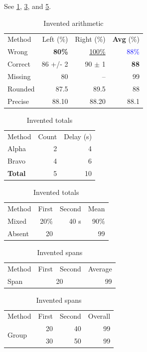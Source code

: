 See \ref{tab:averages}, \ref{tab:totals}, and \ref{tab:spans}.
\begin{table}\caption{Invented arithmetic}\label{tab:averages}
\begin{tabular}{lrrr}
\toprule
Method & Left (\%) & Right (\%) & \textbf{Avg} (\%) \\
Wrong & \textbf{80\%} & \underline{100\%} & \textcolor{blue}{88\%} \\
Correct & 86 +/- 2 & 90 $\pm$ 1 & \textbf{88} \\
Missing & 80 & -- & 99 \\
Rounded & 87.5 & 89.5 & 88 \\
Precise & 88.10 & 88.20 & 88.1 \\
\bottomrule
\end{tabular}\end{table}
\begin{table}\caption{Invented totals}\label{tab:totals}
\begin{tabular}{lrr}
Method & Count & Delay (s) \\
Alpha & 2 & 4 \\
Bravo & 4 & 6 \\
\textbf{Total} & 5 & 10 \\
\end{tabular}
\begin{tabular}{lrrr}
Method & First & Second & Mean \\
Mixed & 20\% & 40 s & 90\% \\
Absent & 20 & & 99 \\
\end{tabular}\end{table}
\begin{table}\caption{Invented spans}\label{tab:spans}
\begin{tabular}{lrrr}
Method & First & Second & Average \\
Span & \multicolumn{2}{c}{20} & 99 \\
\end{tabular}
\begin{tabular}{lrrr}
Method & First & Second & Overall \\
\multirow{2}{*}{Group} & 20 & 40 & 99 \\
 & 30 & 50 & 99 \\
\end{tabular}\end{table}
\nocite{*}
